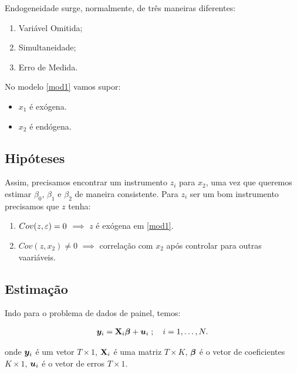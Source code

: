 \documentclass[11pt, oneside, a4paper, article]{article}
\numberwithin{equation}{section}
\begin{document}
Endogeneidade surge, normalmente, de três maneiras diferentes:

\begin{enumerate}\itemsep0pt
	\item Variável Omitida;
	\item Simultaneidade;
	\item Erro de Medida.
\end{enumerate}

No modelo \eqref{mod1} vamos supor:

\begin{itemize}\itemsep0pt
	\item $x_{1}$ é exógena.
	\item $x_{2}$ é endógena.
\end{itemize}

\subsection*{Hipóteses}

Assim, precisamos encontrar um instrumento $z_{i}$ para $x_{2}$, uma vez que queremos estimar $\beta_{0}$, $\beta_{1}$ e $\beta_{2}$ de maneira consistente.
Para $z_{i}$ ser um bom instrumento precisamos que $z$ tenha:

\begin{enumerate}\itemsep0pt
\item $Cov(z, \varepsilon) = 0$ $\implies$  $z$ é exógena em \eqref{mod1}.
\item $Cov(z, x_{2}) \neq 0$ $\implies$  correlação com $x_{2}$ após controlar para outras vaariáveis.
\end{enumerate}

\subsection*{Estimação}

Indo para o problema de dados de painel, temos:

\vspace{-1 em}
\begin{align} \label{mod2}
	\boldsymbol{y}_{i} = \mathbf{X}_{i} \boldsymbol{\beta} + \boldsymbol{u}_{i}
	\; ; \quad i = 1, \dots, N.
\end{align}

\noindent
onde 
$\boldsymbol{y}_{i}$ é um vetor $T \times 1$,
$\mathbf{X}_{i}$ é uma matriz $T \times K$,
$\boldsymbol{\beta}$ é o vetor de coeficientes $K \times 1$,
$\boldsymbol{u}_{i}$ é o vetor de erros $T \times 1$.
\end{document}

